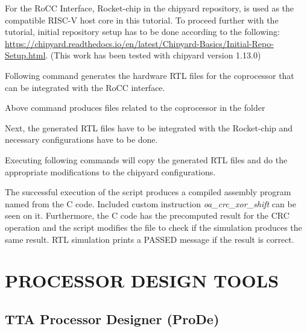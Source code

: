 \documentclass[a4paper,twoside]{tceusermanual}
\begin{document}
For the RoCC Interface, Rocket-chip in the chipyard repository, is used as the compatible RISC-V host core in this 
tutorial. To proceed further with the tutorial, initial repository setup has to be done according  to the following: 
\url{https://chipyard.readthedocs.io/en/latest/Chipyard-Basics/Initial-Repo-Setup.html}. 
(This work has been tested with chipyard version 1.13.0)

Following command generates the hardware RTL files for the coprocessor that can be integrated with the RoCC interface.


Above command produces files related to the coprocessor in the folder 

Next, the generated RTL files have to be integrated with the Rocket-chip and necessary configurations have to be done.

Executing following commands will copy the generated RTL files and do the appropriate modifications to the chipyard 
configurations.






The successful execution of the script produces a compiled assembly program named  from the C code. 
Included custom instruction \textit{oa\_crc\_xor\_shift} can be seen on it.
Furthermore, the C code has the precomputed result for the CRC operation and the script modifies the  
file to check if the simulation produces the same result. RTL simulation prints a PASSED message if the result is correct.  

\chapter{PROCESSOR DESIGN TOOLS}
\label{chapter:procgen}

\section{TTA Processor Designer (ProDe)}
\label{sec:prode}
\end{document}
